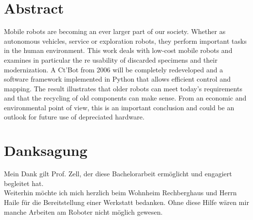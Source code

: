 \documentclass[twoside,11pt, a4paper]{report}
\begin{document}
	 \section*{Abstract}
	 
	 Mobile robots are becoming an ever larger part of our society. Whether as autonomous vehicles, service or exploration robots, they perform important tasks in the human environment. This work deals with low-cost mobile robots and examines in particular the re usability of discarded specimens and their modernization. A Ct'Bot from 2006 will be completely redeveloped and a software framework implemented in Python that allows efficient control and mapping. The result illustrates that older robots can meet today's requirements and that the recycling of old components can make sense. From an economic and environmental point of view, this is an important conclusion and could be an outlook for future use of depreciated hardware. 
	
	
	
	\newpage
	
	\section*{Danksagung}
	Mein Dank gilt Prof. Zell, der diese Bachelorarbeit ermöglicht und engagiert begleitet hat. \\
	Weiterhin möchte ich mich herzlich beim Wohnheim Rechberghaus und Herrn Haile für die Bereitstellung einer Werkstatt bedanken. Ohne diese Hilfe wären mir manche Arbeiten am Roboter nicht möglich gewesen. 
	
	\cleardoublepage
	
	
	\renewcommand{\baselinestretch}{1.3}
	\small\normalsize
	
	\tableofcontents
	
	\renewcommand{\baselinestretch}{1}
	\small\normalsize
	
	\cleardoublepage
	
	
	
	\setcounter{page}{1}
	
\end{document}
